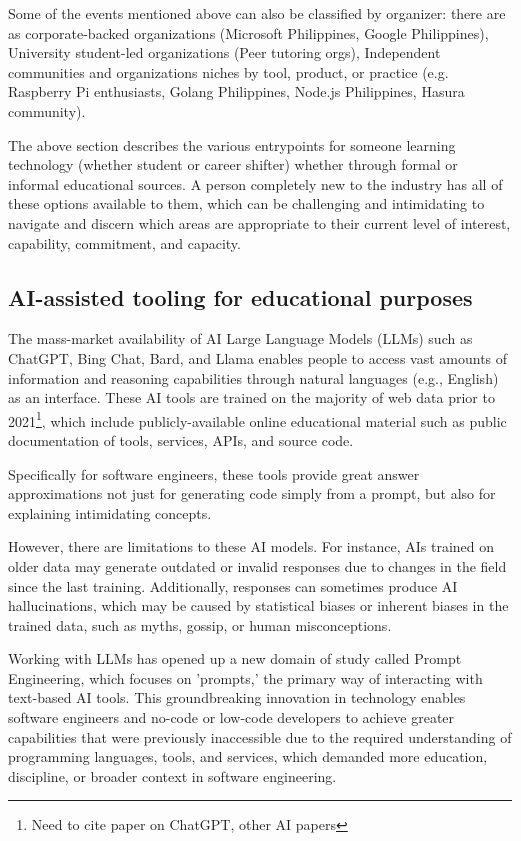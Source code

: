 \documentclass[journal, onecolumn]{IEEEtran}
\begin{document}
Some of the events mentioned above can also be classified by organizer: there are as corporate-backed organizations 
  (Microsoft Philippines, Google Philippines), University student-led organizations (Peer tutoring orgs), 
  Independent communities and organizations niches by tool, product, or practice 
  (e.g. Raspberry Pi enthusiasts, Golang Philippines, Node.js Philippines, Hasura community).

The above section describes the various entrypoints for someone learning technology (whether student or career shifter)
whether through formal or informal educational sources. A person completely new to the industry
has all of these options available to them, which can be challenging and intimidating to 
navigate and discern which areas are appropriate to their current level of interest, capability, commitment, and capacity.

\subsection{AI-assisted tooling for educational purposes}
The mass-market availability of AI Large Language Models (LLMs) such as ChatGPT, 
Bing Chat, Bard, and Llama enables people to access vast amounts of information 
and reasoning capabilities through natural languages (e.g., English) as an 
interface. These AI tools are trained on the majority of web data prior to 
2021\footnote{Need to cite paper on ChatGPT, other AI papers}, which include
publicly-available online educational material such as public documentation of
tools, services, APIs, and source code. 

Specifically for software engineers, these tools provide great answer 
approximations not just for generating code simply from a prompt, but also for 
explaining intimidating concepts. 

However, there are limitations to these AI models. For instance, AIs trained on 
older data may generate outdated or invalid responses due to changes in the field 
since the last training. Additionally, responses can sometimes produce AI 
hallucinations, which may be caused by statistical biases or inherent biases in 
the trained data, such as myths, gossip, or human misconceptions.

Working with LLMs has opened up a new domain of study called Prompt Engineering, 
which focuses on 'prompts,' the primary way of interacting with text-based AI 
tools. This groundbreaking innovation in technology enables software engineers 
and no-code or low-code developers to achieve greater capabilities that were 
previously inaccessible due to the required understanding of programming 
languages, tools, and services, which demanded more education, discipline, or 
broader context in software engineering.
\end{document}
